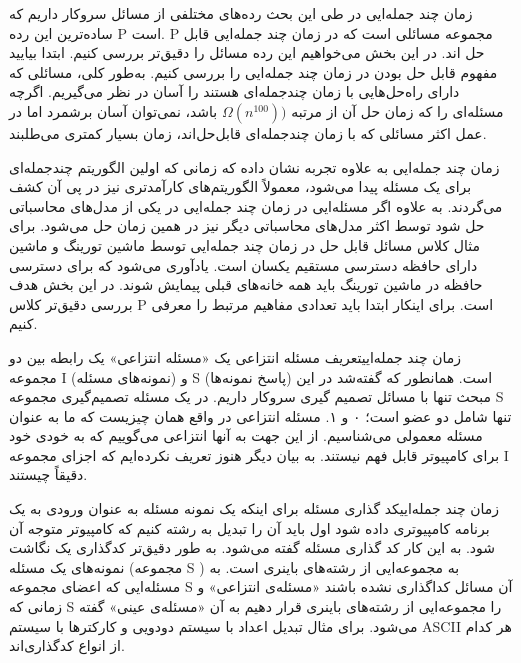 \begin{itemframe}{زمان چند جمله‌ایی}
\decLineSpace
\itm
در طی این بحث رده‌های مختلفی از مسائل سروکار داریم که ساده‌ترین این رده P است. P مجموعه مسائلی است که در زمان چند جمله‌ایی قابل حل اند. در این بخش می‌خواهیم این رده مسائل را دقیق‌تر بررسی کنیم.
\itm
ابتدا بیایید مفهوم قابل حل بودن در زمان چند جمله‌ایی را بررسی کنیم. به‌طور کلی، مسائلی که دارای راه‌حل‌هایی با زمان چندجمله‌ای هستند را آسان در نظر می‌گیریم.
\itm
اگرچه مسئله‌ای را که زمان حل آن از مرتبه
$\Omega(n^{100}))$
 باشد، نمی‌توان آسان برشمرد اما در عمل اکثر مسائلی که با زمان چندجمله‌ای قابل‌حل‌اند، زمان بسیار کمتری می‌طلبند.
\end{itemframe}
\begin{itemframe}{زمان چند جمله‌ایی}
\itm
به علاوه تجربه نشان داده که زمانی که اولین الگوریتم چندجمله‌ای برای یک مسئله پیدا می‌شود، معمولاً الگوریتم‌های کارآمدتری نیز در پی آن کشف می‌گردند. به علاوه اگر مسئله‌ایی در زمان چند جمله‌ایی در یکی از مدل‌های محاسباتی حل شود توسط اکثر مدل‌های محاسباتی دیگر نیز در همین زمان حل می‌شود.
\itm
برای مثال کلاس مسائل قابل حل در زمان چند جمله‌ایی توسط ماشین تورینگ و ماشین دارای حافظه دسترسی مستقیم یکسان است.
‌یادآوری می‌شود که برای دسترسی حافظه در ماشین تورینگ باید همه خانه‌های قبلی پیمایش شوند.
\itm
در این بخش هدف بررسی دقیق‌تر کلاس P است. برای اینکار ابتدا باید تعدادی مفاهیم مرتبط را معرفی کنیم.
\end{itemframe}

\begin{itemframe-s}{زمان چند جمله‌ایی}{تعریف مسئله انتزاعی}
\itm
یک «مسئله انتزاعی»
 یک رابطه بین دو مجموعه I (نمونه‌های مسئله) و S (پاسخ نمونه‌ها) است.
همانطور که گفته‌شد در این مبحث تنها با مسائل تصمیم گیری سروکار داریم.
در یک مسئله تصمیم‌گیری مجموعه S تنها شامل دو عضو است؛ ۰ و ۱.
\itm
مسئله انتزاعی در واقع همان چیزیست که ما به عنوان مسئله معمولی می‌شناسیم. از این جهت به آنها انتزاعی می‌گوییم که به خودی خود  برای کامپیوتر قابل فهم نیستند. به بیان دیگر هنوز تعریف نکرده‌ایم که اجزای مجموعه I دقیقاً چیستند.
\end{itemframe-s}
\begin{itemframe-s}{زمان چند جمله‌ایی}{کد گذاری مسئله}
\itm
برای اینکه یک نمونه مسئله به عنوان ورودی به یک برنامه کامپیوتری داده شود اول باید آن را تبدیل به رشته کنیم که کامپیوتر متوجه آن شود.
\itm
به این کار کد گذاری
مسئله گفته می‌شود. به طور دقیق‌تر کدگذاری یک نگاشت نمونه‌های یک مسئله (مجموعه S )
به مجموعه‌ایی از رشته‌های باینری است.
\itm
به مسئله‌ایی که اعضای مجموعه S آن مسائل کداگذاری نشده باشند «مسئله‌ی انتزاعی»
و زمانی که S را مجموعه‌ایی از رشته‌های باینری قرار دهیم به آن «مسئله‌ی عینی»
گفته می‌شود.
\itm
برای مثال تبدیل اعداد با سیستم دودویی و کارکترها با سیستم ASCII هر کدام از انواع کدگذاری‌اند.
\end{itemframe-s}

